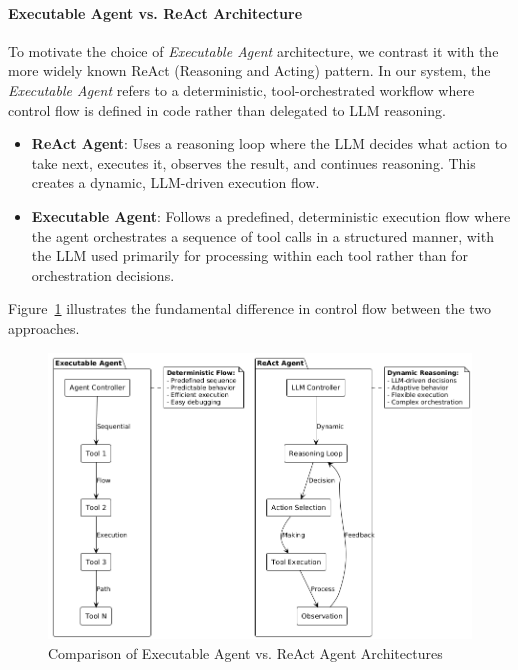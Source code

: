 \begin{spacing}{1.2}
\paragraph{Executable Agent vs. ReAct Architecture}
To motivate the choice of \textit{Executable Agent} architecture, we contrast it with the more widely known ReAct (Reasoning and Acting) pattern. In our system, the \textit{Executable Agent} refers to a deterministic, tool-orchestrated workflow where control flow is defined in code rather than delegated to LLM reasoning.

\begin{itemize}
    \item \textbf{ReAct Agent}: Uses a reasoning loop where the LLM decides what action to take next, executes it, observes the result, and continues reasoning. This creates a dynamic, LLM-driven execution flow.
    \item \textbf{Executable Agent}: Follows a predefined, deterministic execution flow where the agent orchestrates a sequence of tool calls in a structured manner, with the LLM used primarily for processing within each tool rather than for orchestration decisions.
\end{itemize}


Figure~\ref{fig:agent_comparison} illustrates the fundamental difference in control flow between the two approaches.

\begin{figure}[H] 
	\centering 
	\includegraphics[scale=0.6]{images/agent_architecture_comparison.png} 
	\caption{Comparison of Executable Agent vs. ReAct Agent Architectures} 
	\label{fig:agent_comparison} 
\end{figure}


\end{spacing}
